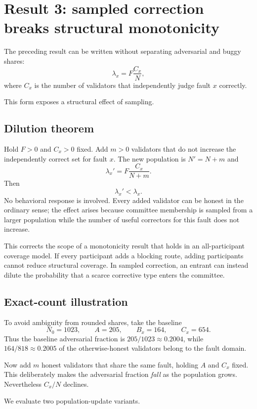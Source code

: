 \section{Result 3: sampled correction breaks structural monotonicity}
\label{sec:sampling}

The preceding result can be written without separating adversarial and buggy shares:
\[
\boxed{
\lambda_x=F\frac{C_x}{N},
}
\]
where \(C_x\) is the number of validators that independently judge fault \(x\) correctly.

This form exposes a structural effect of sampling.

\subsection{Dilution theorem}

Hold \(F>0\) and \(C_x>0\) fixed. Add \(m>0\) validators that do not increase the independently correct set for fault \(x\). The new population is \(N'=N+m\) and
\[
\lambda_x' = F\frac{C_x}{N+m}.
\]
Then
\[
\boxed{
\lambda_x'<\lambda_x.
}
\]
No behavioral response is involved. Every added validator can be honest in the ordinary sense; the effect arises because committee membership is sampled from a larger population while the number of useful correctors for this fault does not increase.

This corrects the scope of a monotonicity result that holds in an all-participant coverage model. If every participant adds a blocking route, adding participants cannot reduce structural coverage. In sampled correction, an entrant can instead dilute the probability that a scarce corrective type enters the committee.

\subsection{Exact-count illustration}

To avoid ambiguity from rounded shares, take the baseline
\[
N_0=1023,
\qquad
A=205,
\qquad
B_x=164,
\qquad
C_x=654.
\]
Thus the baseline adversarial fraction is \(205/1023\approx0.2004\), while \(164/818\approx0.2005\) of the otherwise-honest validators belong to the fault domain.

Now add \(m\) honest validators that share the same fault, holding \(A\) and \(C_x\) fixed. This deliberately makes the adversarial fraction \emph{fall} as the population grows. Nevertheless \(C_x/N\) declines.

We evaluate two population-update variants.

